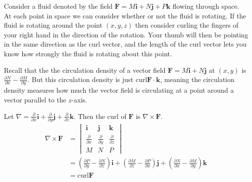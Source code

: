 \documentclass[12pt, letter]{article}
\theoremstyle{plain}
\numberwithin{theorem}{section}
\theoremstyle{definition}
\begin{document}
\bigskip

\hrulefill

\bigskip

Consider a fluid denoted by the field $\bm{F} = M\bm{i}+N\bm{j}+P\bm{k}$ flowing through space. At each point in space we can consider whether or not the fluid is rotating. If the fluid is rotating around the point $(x,y,z)$ then consider curling the fingers of your right hand in the direction of the rotation. Your thumb will then be pointing in the same direction as the curl vector, and the length of the curl vector lets you know how strongly the fluid is rotating about this point.

\bigskip

\hrulefill

\bigskip

Recall that the the circulation density of a vector field $\bm{F}=M\bm{i}+N\bm{j}$ at $(x,y)$ is $\frac{\partial N}{\partial x}-\frac{\partial M}{\partial y}$. But this circulation density is just $\text{curl}\bm{F}\cdot\bm{k}$, meaning the circulation density measures how much the vector field is circulating at a point around a vector parallel to the $z$-axis.

\bigskip

\hrulefill

\bigskip

Let $\nabla = \frac{\partial}{\partial x}\bm{i}+\frac{\partial}{\partial y}\bm{j}+\frac{\partial}{\partial z}\bm{k}$. Then the curl of $\bm{F}$ is $\nabla \times \bm{F}$.
\begin{align*}
\nabla \times \bm{F} &= \begin{vmatrix} \bm{i} & \bm{j} & \bm{k} \\ \frac{\partial}{\partial x} & \frac{\partial}{\partial y} & \frac{\partial}{\partial z} \\ M & N & P \end{vmatrix}\\
&= \left(\frac{\partial P}{\partial y}-\frac{\partial N}{\partial z}\right)\bm{i}+\left(\frac{\partial M}{\partial z}-\frac{\partial P}{\partial x}\right)\bm{j}+\left(\frac{\partial N}{\partial x}-\frac{\partial M}{\partial y}\right)\bm{k}\\
&= \text{curl}\bm{F}
\end{align*}

\bigskip

\hrulefill

\bigskip
\end{document}

